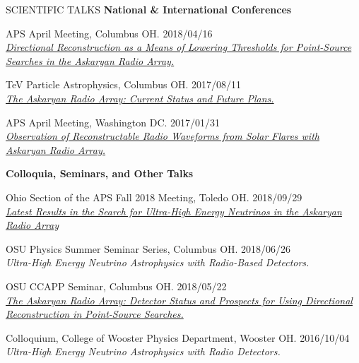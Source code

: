 \documentclass{resume} %
\begin{document}
\begin{rSection}{SCIENTIFIC TALKS}
{\bf National \& International Conferences}
\begin{etaremune}
\item APS April Meeting, Columbus OH. \hfill 2018/04/16 \\
\href{http://meetings.aps.org/Meeting/APR18/Session/U17.7}{{\em Directional Reconstruction as a Means of Lowering Thresholds for Point-Source Searches in the Askaryan Radio Array.}}

\item TeV Particle Astrophysics, Columbus OH. \hfill 2017/08/11 \\
\href{http://indico.cern.ch/event/615891/contributions/2648790/}{{\em The Askaryan Radio Array: Current Status and Future Plans.} }

\item APS April Meeting, Washington DC. \hfill 2017/01/31 \\
\href{http://meetings.aps.org/Meeting/APR17/Session/Y3.2}{{\em Observation of Reconstructable Radio Waveforms from Solar Flares with Askaryan Radio Array.}}
\end{etaremune}

{\bf Colloquia, Seminars, and Other Talks}
\begin{etaremune}

\item Ohio Section of the APS Fall 2018 Meeting, Toledo OH. \hfill 2018/09/29 \\
\href{http://meetings.aps.org/Meeting/OSF18/Session/A01.2}{\em Latest Results in the Search for Ultra-High Energy Neutrinos in the Askaryan Radio Array} 

\item OSU Physics Summer Seminar Series, Columbus OH. \hfill 2018/06/26 \\
{\em Ultra-High Energy Neutrino Astrophysics with Radio-Based Detectors.} 

\item OSU CCAPP Seminar, Columbus OH. \hfill 2018/05/22 \\
\href{http://ccapp.osu.edu/pastseminars.html#past}{\textit{The Askaryan Radio Array: Detector Status and Prospects for Using Directional Reconstruction in Point-Source Searches.}}

\item Colloquium, College of Wooster Physics Department, Wooster OH. \hfill 2016/10/04 \\
{\em Ultra-High Energy Neutrino Astrophysics with Radio Detectors.}


\end{etaremune}
\end{rSection}
\end{document}
